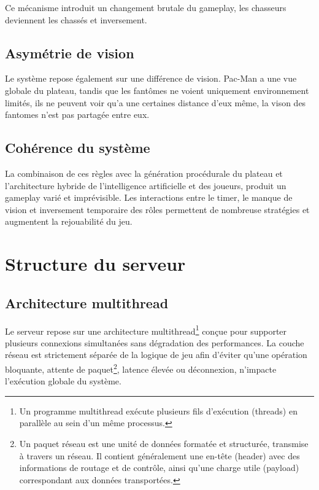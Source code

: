 \documentclass[a4paper, 11pt]{article}
\begin{document}
Ce mécanisme introduit un changement brutale du gameplay, les chasseurs deviennent les chassés et inversement.

\subsection{Asymétrie de vision}

Le système repose également sur une différence de vision.
Pac-Man a une vue globale du plateau, tandis que les fantômes ne voient uniquement environnement limités, ils ne peuvent voir qu'a une certaines distance d'eux même, la vison des fantomes n'est pas partagée entre eux.

\subsection{Cohérence du système}

La combinaison de ces règles avec la génération procédurale du plateau et l’architecture hybride de l’intelligence artificielle et des joueurs, produit un gameplay varié et imprévisible.
Les interactions entre le timer, le manque de vision et inversement temporaire des rôles permettent de nombreuse stratégies et augmentent la rejouabilité du jeu.



\section{Structure du serveur}

\subsection{Architecture multithread}

Le serveur repose sur une architecture multithread\footnote{Un programme multithread exécute plusieurs fils d'exécution (threads) en parallèle au sein d’un même processus.} conçue pour supporter plusieurs connexions simultanées sans dégradation des performances. 
La couche réseau est strictement séparée de la logique de jeu afin d’éviter qu’une opération bloquante, attente de paquet\footnote{Un paquet réseau est une unité de données formatée et structurée, transmise à travers un réseau. Il contient généralement une en-tête (header) avec des informations de routage et de contrôle, ainsi qu’une charge utile (payload) correspondant aux données transportées.}, latence élevée ou déconnexion, n’impacte l’exécution globale du système.
\end{document}
